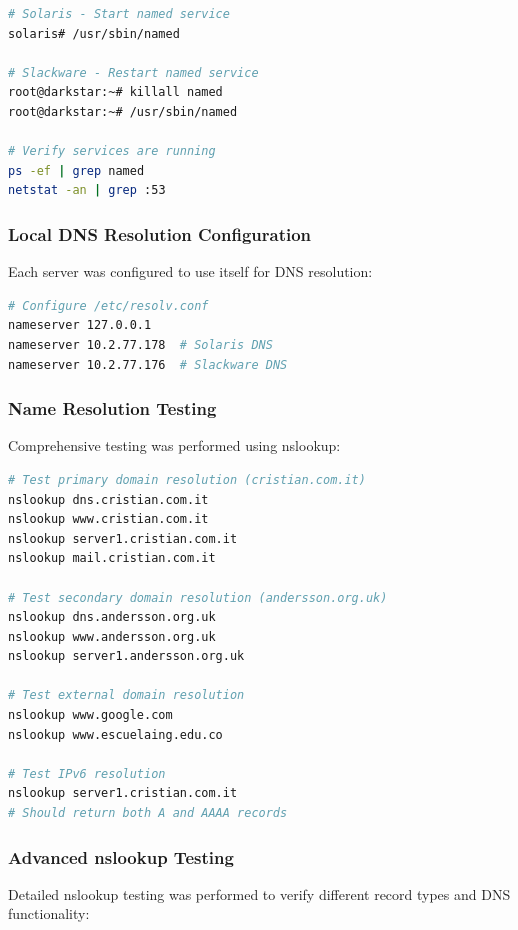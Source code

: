 \documentclass[12pt,a4paper]{article}
\begin{document}
\begin{lstlisting}[language=bash, caption=Starting DNS Services]
# Solaris - Start named service
solaris# /usr/sbin/named

# Slackware - Restart named service
root@darkstar:~# killall named
root@darkstar:~# /usr/sbin/named

# Verify services are running
ps -ef | grep named
netstat -an | grep :53
\end{lstlisting}

\subsubsection{Local DNS Resolution Configuration}
Each server was configured to use itself for DNS resolution:

\begin{lstlisting}[language=bash, caption=DNS Resolution Configuration]
# Configure /etc/resolv.conf
nameserver 127.0.0.1
nameserver 10.2.77.178  # Solaris DNS
nameserver 10.2.77.176  # Slackware DNS
\end{lstlisting}

\subsubsection{Name Resolution Testing}
Comprehensive testing was performed using nslookup:

\begin{lstlisting}[language=bash, caption=DNS Resolution Testing]
# Test primary domain resolution (cristian.com.it)
nslookup dns.cristian.com.it
nslookup www.cristian.com.it
nslookup server1.cristian.com.it
nslookup mail.cristian.com.it

# Test secondary domain resolution (andersson.org.uk)
nslookup dns.andersson.org.uk
nslookup www.andersson.org.uk
nslookup server1.andersson.org.uk

# Test external domain resolution
nslookup www.google.com
nslookup www.escuelaing.edu.co

# Test IPv6 resolution
nslookup server1.cristian.com.it
# Should return both A and AAAA records
\end{lstlisting}

\subsubsection{Advanced nslookup Testing}
Detailed nslookup testing was performed to verify different record types and DNS functionality:
\end{document}
